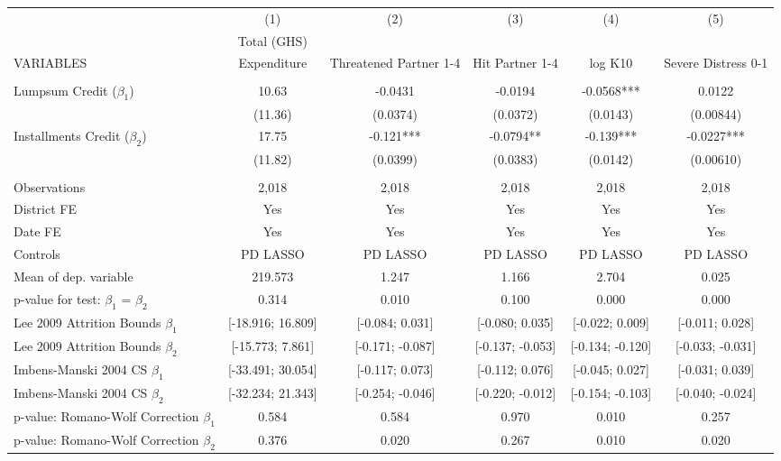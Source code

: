 \begin{tabular}{lccccc} \hline
 & (1) & (2) & (3) & (4) & (5) \\
 & Total (GHS) &  &  &  &  \\
VARIABLES & Expenditure & Threatened Partner 1-4 & Hit Partner 1-4 & log K10 & Severe Distress 0-1 \\ \hline
 &  &  &  &  &  \\
Lumpsum Credit ($\beta_1$) & 10.63 & -0.0431 & -0.0194 & -0.0568*** & 0.0122 \\
 & (11.36) & (0.0374) & (0.0372) & (0.0143) & (0.00844) \\
Installments Credit ($\beta_2$) & 17.75 & -0.121*** & -0.0794** & -0.139*** & -0.0227*** \\
 & (11.82) & (0.0399) & (0.0383) & (0.0142) & (0.00610) \\
 &  &  &  &  &  \\
Observations & 2,018 & 2,018 & 2,018 & 2,018 & 2,018 \\
District FE & Yes & Yes & Yes & Yes & Yes \\
Date FE & Yes & Yes & Yes & Yes & Yes \\
Controls & PD LASSO & PD LASSO & PD LASSO & PD LASSO & PD LASSO \\
Mean of dep. variable & 219.573 & 1.247 & 1.166 & 2.704 & 0.025 \\
p-value for test: $\beta_1$ = $\beta_2$ & 0.314 & 0.010 & 0.100 & 0.000 & 0.000 \\
Lee 2009 Attrition Bounds $\beta_1$ & [-18.916; 16.809] & [-0.084; 0.031] & [-0.080; 0.035] & [-0.022; 0.009] & [-0.011; 0.028] \\
Lee 2009 Attrition Bounds $\beta_2$ & [-15.773; 7.861] & [-0.171; -0.087] & [-0.137; -0.053] & [-0.134; -0.120] & [-0.033; -0.031] \\
Imbens-Manski 2004 CS $\beta_1$ & [-33.491; 30.054] & [-0.117; 0.073] & [-0.112; 0.076] & [-0.045; 0.027] & [-0.031; 0.039] \\
Imbens-Manski 2004 CS $\beta_2$ & [-32.234; 21.343] & [-0.254; -0.046] & [-0.220; -0.012] & [-0.154; -0.103] & [-0.040; -0.024] \\
p-value: Romano-Wolf Correction $\beta_1$ & 0.584 & 0.584 & 0.970 & 0.010 & 0.257 \\
 p-value: Romano-Wolf Correction $\beta_2$ & 0.376 & 0.020 & 0.267 & 0.010 & 0.020 \\ \hline
\end{tabular}
